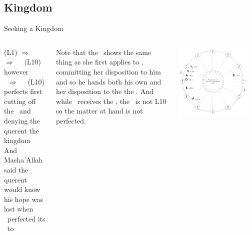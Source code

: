 \subsection{Kingdom}
\begin{frame}[t]{Seeking a Kingdom}
\begin{columns}[T, onlytextwidth]
\Mercury\Retrograde (L1) $\Rightarrow$ \Conjunction\Sun\ $\Rightarrow$ \Sextile\ \Saturn\ (L10) \\
however \\
\Mars\ $\Rightarrow$ \Square\ \Saturn\ (L10) perfects first \\
cutting off the \Sun\ and denying the querent the kingdom \\
\vspace{0.25cm}
And Masha'Allah said the querent would know his hope was lost when \Mars\ perfected its \Square\ to \Saturn \\
\vspace{0.25cm}

Note that the \Moon\ shows the same thing as she first applies to \Mercury, committing her disposition to him and so he hands both his own and her disposition to the the \Sun. And
while  \Mercury\ receives the \Sun, the \Sun\ is not L10 so the matter at hand is not perfected. \\


\begin{center}
{\includegraphics[width=0.9\textwidth]{charts/50-chart-kingdom}} \\
\end{center}
\end{columns}
\end{frame}
